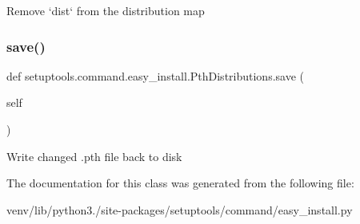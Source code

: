 \begin{DoxyVerb}Remove `dist` from the distribution map\end{DoxyVerb}
 \mbox{\label{classsetuptools_1_1command_1_1easy__install_1_1_pth_distributions_ab4d9f759b78444fc81dd9d9219c11031}} 
\subsubsection{\texorpdfstring{save()}{save()}}
{\footnotesize\ttfamily def setuptools.\+command.\+easy\+\_\+install.\+Pth\+Distributions.\+save (\begin{DoxyParamCaption}\item[{}]{self }\end{DoxyParamCaption})}

\begin{DoxyVerb}Write changed .pth file back to disk\end{DoxyVerb}
 

The documentation for this class was generated from the following file\+:\begin{DoxyCompactItemize}
\item 
venv/lib/python3./site-\/packages/setuptools/command/easy\+\_\+install.\+py\end{DoxyCompactItemize}
